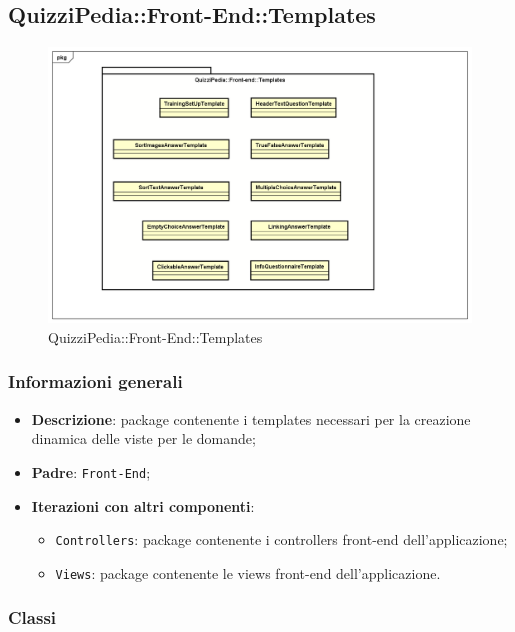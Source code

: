 \newpage

\subsection{QuizziPedia::Front-End::Templates}

	\label{QuizziPedia::Front-End::Templates}

	\begin{figure}[h]
		\centering
		\includegraphics[scale=0.5,keepaspectratio]{UML/Package/QuizziPedia_Front-end_Templates.png}
		\caption{QuizziPedia::Front-End::Templates}
	\end{figure}
	
	\subsubsection{Informazioni generali}
		\begin{itemize}
			\item \textbf{Descrizione}: package contenente i templates necessari per la creazione dinamica delle viste per le domande;
			\item \textbf{Padre}: \texttt{Front-End};
			\item \textbf{Iterazioni con altri componenti}: 
				\begin{itemize}
					\item \texttt{Controllers}: package contenente i controllers front-end dell'applicazione;
					\item \texttt{Views}: package contenente le views front-end dell'applicazione.
				\end{itemize}
		\end{itemize}

	\subsubsection{Classi}
